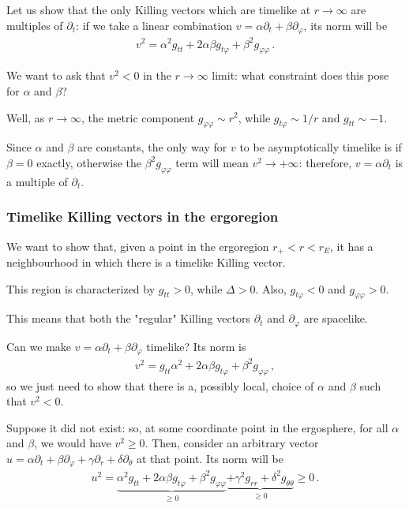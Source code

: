 \documentclass[main.tex]{subfiles}
\begin{document}
Let us show that the only Killing vectors which are timelike at \(r \to \infty \) are multiples of \(\partial_t\): if we take a linear combination \(v = \alpha \partial_t + \beta \partial_\varphi\), its norm will be 
%
\begin{align}
v^2 = \alpha^2 g_{tt} + 2 \alpha \beta g_{t \varphi } + \beta^2 g_{\varphi \varphi }
\,.
\end{align}

We want to ask that \(v^2 < 0\) in the \(r \to \infty \) limit: what constraint does this pose for \(\alpha \) and \(\beta \)? 

Well, as \(r \to \infty \), the metric component \(g_{\varphi \varphi } \sim r^2 \), while \(g_{t \varphi } \sim 1 /r\) and \(g_{tt} \sim -1\).

Since \(\alpha\) and \(\beta\) are constants, the only way for \(v\) to be asymptotically timelike is if \(\beta = 0\) exactly, otherwise the \(\beta^2 g_{\varphi \varphi }\) term will mean \(v^2 \to + \infty \): therefore, \(v = \alpha \partial_t\) is a multiple of \(\partial_t\). 

\subsubsection{Timelike Killing vectors in the ergoregion}

We want to show that, given a point in the ergoregion \(r_+ < r < r_E\), it has a neighbourhood in which there is a timelike Killing vector.

This region is characterized by \(g_{tt} > 0\), while \(\Delta > 0\).
Also, \(g_{t \varphi } < 0\) and \(g_{\varphi \varphi } > 0\). 

This means that both the "regular" Killing vectors \(\partial_t\) and \(\partial_\varphi \) are spacelike. 

Can we make \(v = \alpha \partial_t + \beta \partial_\varphi \) timelike?
Its norm is 
%
\begin{align}
v^2 = g_{tt} \alpha^2 + 2 \alpha \beta g_{t \varphi } + \beta^2 g_{\varphi \varphi }
\,,
\end{align}
%
so we just need to show that there is a, possibly local, choice of \(\alpha \) and \(\beta \) such that \(v^2 < 0\).

Suppose it did not exist: so, at some coordinate point in the ergosphere, for all \(\alpha \) and \(\beta \), we would have \(v^2 \geq 0\). 
Then, consider an arbitrary vector \(u = \alpha \partial_t + \beta \partial_\varphi + \gamma \partial_r + \delta \partial_\theta \) at that point. 
Its norm will be  
%
\begin{align}
u^2 = \underbrace{\alpha^2 g_{tt} + 2 \alpha \beta g_{t \varphi } + \beta^2 g_{\varphi \varphi }}_{\geq 0} \underbrace{+ \gamma^2 g_{rr} + \delta^2 g_{\theta \theta }}_{\geq 0} \geq 0
\,.
\end{align}
\end{document}
